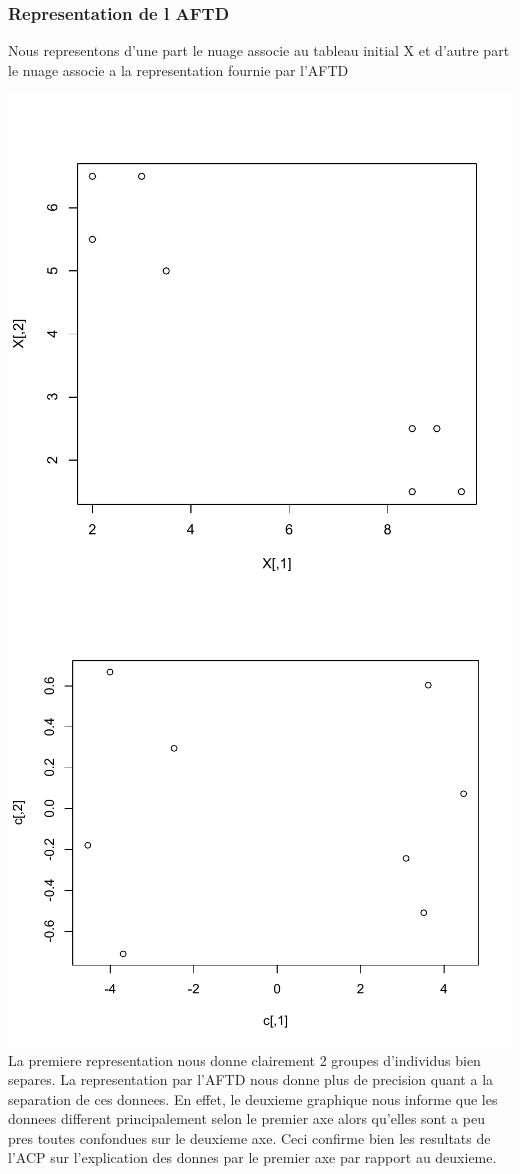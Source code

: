 \documentclass[a4paper,11pt]{article}
\begin{document}
\subsubsection{Representation de l AFTD}

\noindent Nous representons d'une part le nuage associe au tableau initial X et d'autre part le nuage associe a la representation fournie par l'AFTD

\hspace{-1.8cm} \includegraphics[width=.6\textwidth]{Exo1/plot_X_MDS.pdf}
\includegraphics[width=.6\textwidth]{Exo1/plot_MDS.pdf}\\

\noindent La premiere representation nous donne clairement 2 groupes d'individus bien separes. La representation par l'AFTD nous donne plus de precision quant a la separation de ces donnees. En effet, le deuxieme graphique nous informe que les donnees different principalement selon le premier axe alors qu'elles sont a peu pres toutes confondues sur le deuxieme axe. Ceci confirme bien les resultats de l'ACP sur l'explication des donnes par le premier axe par rapport au deuxieme.
\end{document}
